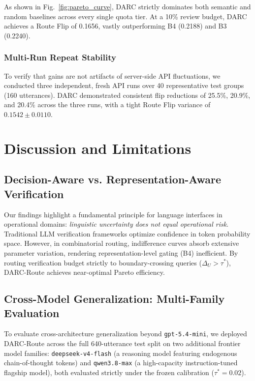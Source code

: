 \documentclass[conference]{IEEEtran}
\begin{document}
As shown in Fig.~\ref{fig:pareto_curve}, DARC strictly dominates both semantic and random baselines across every single quota tier. At a 10\% review budget, DARC achieves a Route Flip of 0.1656, vastly outperforming B4 (0.2188) and B3 (0.2240).

\subsubsection{Multi-Run Repeat Stability}
To verify that gains are not artifacts of server-side API fluctuations, we conducted three independent, fresh API runs over 40 representative test groups (160 utterances). DARC demonstrated consistent flip reductions of 25.5\%, 20.9\%, and 20.4\% across the three runs, with a tight Route Flip variance of $0.1542 \pm 0.0110$.

\section{Discussion and Limitations}

\subsection{Decision-Aware vs. Representation-Aware Verification}
Our findings highlight a fundamental principle for language interfaces in operational domains: \textit{linguistic uncertainty does not equal operational risk}. Traditional LLM verification frameworks optimize confidence in token probability space. However, in combinatorial routing, indifference curves absorb extensive parameter variation, rendering representation-level gating (B4) inefficient. By routing verification budget strictly to boundary-crossing queries ($\Delta_U > \tau^*$), DARC-Route achieves near-optimal Pareto efficiency.

\subsection{Cross-Model Generalization: Multi-Family Evaluation}
To evaluate cross-architecture generalization beyond \texttt{gpt-5.4-mini}, we deployed DARC-Route across the full 640-utterance test split on two additional frontier model families: \texttt{deepseek-v4-flash} (a reasoning model featuring endogenous chain-of-thought tokens) and \texttt{qwen3.8-max} (a high-capacity instruction-tuned flagship model), both evaluated strictly under the frozen calibration ($\tau^* = 0.02$).
\end{document}
